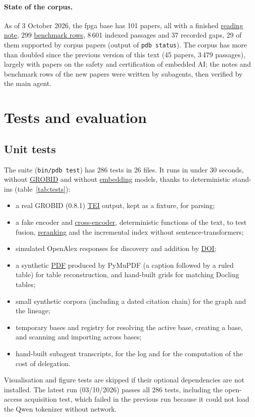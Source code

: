 \documentclass[11pt,a4paper]{article}
\newcommand{\cmd}[1]{\texttt{#1}}
\newcommand{\gl}[2]{\hyperlink{gl:#1}{\textcolor{glcolor}{#2}}}
\begin{document}
\paragraph{State of the corpus.} As of 3 October 2026, the fpga base has 101 papers, all with a
finished \gl{fiche}{reading note}, 299 \gl{benchmark}{benchmark rows}, 8\,601 indexed passages and 37 recorded gaps, 29
of them supported by corpus papers (output of \cmd{pdb status}). The corpus has more than
doubled since the previous version of this text (45 papers, 3\,479 passages), largely with
papers on the safety and certification of embedded AI; the notes and benchmark rows of the
new papers were written by subagents, then verified by the main agent.

\section{Tests and evaluation}
\label{sec:tests}

\subsection{Unit tests}

The suite (\cmd{bin/pdb test}) has 286 tests in 26 files. It runs in under 30 seconds,
without \gl{GROBID}{GROBID} and without \gl{embedding}{embedding} models, thanks to deterministic stand-ins
(table~\ref{tab:tests}):
\begin{itemize}
  \item a real GROBID (0.8.1) \gl{TEI}{TEI} output, kept as a fixture, for parsing;
  \item a fake encoder and \gl{crossenc}{cross-encoder}, deterministic functions of the text, to test
    fusion, \gl{reranking}{reranking} and the incremental index without sentence-transformers;
  \item simulated OpenAlex responses for discovery and addition by \gl{DOI}{DOI};
  \item a synthetic \gl{PDF}{PDF} produced by PyMuPDF (a caption followed by a ruled table) for table
    reconstruction, and hand-built grids for matching Docling tables;
  \item small synthetic corpora (including a dated citation chain) for the graph and the
    lineage;
  \item temporary bases and registry for resolving the active base, creating a base, and
    scanning and importing across bases;
  \item hand-built subagent transcripts, for the log and for the computation of the cost of
    delegation.
\end{itemize}
Visualisation and figure tests are skipped if their optional dependencies are not installed.
The latest run (03/10/2026) passes all 286 tests, including the open-access acquisition test,
which failed in the previous run because it could not load the Qwen tokenizer without network.
\end{document}

